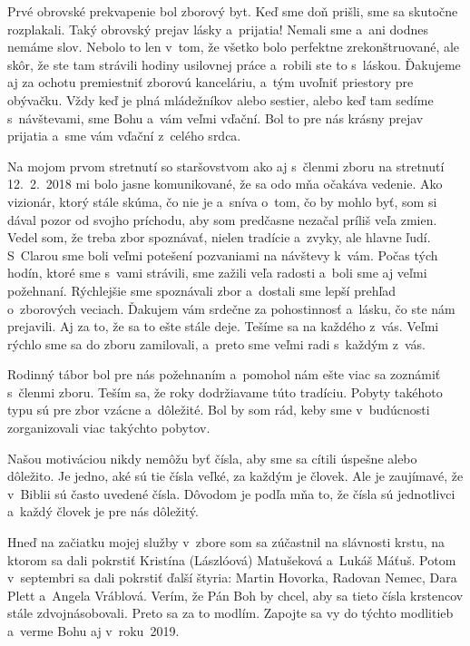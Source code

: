 Prvé obrovské prekvapenie bol zborový byt. Keď sme doň prišli, sme sa skutočne rozplakali. Taký obrovský prejav lásky a~prijatia! Nemali sme a~ani dodnes nemáme slov. Nebolo to len v~tom, že všetko bolo perfektne zrekonštruované, ale skôr, že ste tam strávili hodiny usilovnej práce a~robili ste to s~láskou. Ďakujeme aj za ochotu premiestniť zborovú kanceláriu, a~tým uvoľniť priestory pre obývačku. Vždy keď je plná mládežníkov alebo sestier, alebo keď tam sedíme s~návštevami, sme Bohu a~vám veľmi vďační. Bol to pre nás krásny prejav prijatia a~sme vám vďační z~celého srdca.

Na mojom prvom stretnutí so staršovstvom ako aj s~členmi zboru na stretnutí 12.~2.~2018 mi bolo jasne komunikované, že sa odo mňa očakáva vedenie. Ako vizionár, ktorý stále skúma, čo nie je a~sníva o~tom, čo by mohlo byť, som si dával pozor od svojho príchodu, aby som predčasne nezačal príliš veľa zmien. Vedel som, že treba zbor spoznávať, nielen tradície a~zvyky, ale hlavne ľudí. S~Clarou sme boli veľmi potešení pozvaniami na návštevy k~vám. Počas tých hodín, ktoré sme s~vami strávili, sme zažili veľa radosti a~boli sme aj veľmi požehnaní. Rýchlejšie sme spoznávali zbor a~dostali sme lepší prehľad o~zborových veciach. Ďakujem vám srdečne za pohostinnosť a~lásku, čo ste nám prejavili.  Aj za to, že sa to ešte stále deje. Tešíme sa na každého z~vás. Veľmi rýchlo sme sa do zboru zamilovali, a~preto sme veľmi radi s~každým z~vás.

Rodinný tábor bol pre nás požehnaním a~pomohol nám ešte viac sa zoznámiť s~členmi zboru. Teším sa, že roky dodržiavame túto tradíciu. Pobyty takéhoto typu sú pre zbor vzácne a~dôležité. Bol by som rád, keby sme v~budúcnosti zorganizovali viac takýchto pobytov.


Našou motiváciou nikdy nemôžu byť čísla, aby sme sa cítili úspešne alebo dôležito. Je jedno, aké sú tie čísla veľké, za každým je človek. Ale je zaujímavé, že v~Biblii sú často uvedené čísla. Dôvodom je podľa mňa to, že čísla sú jednotlivci a~každý človek je pre nás dôležitý.

Hneď na začiatku mojej služby v~zbore som sa zúčastnil na slávnosti krstu, na ktorom sa dali pokrstiť Kristína (Lászlóová) Matušeková a~Lukáš Máťuš. Potom v~septembri sa dali pokrstiť ďalší štyria: Martin Hovorka, Radovan Nemec, Dara Plett a~Angela Vráblová. Verím, že Pán Boh by chcel, aby sa tieto čísla krstencov stále zdvojnásobovali. Preto sa za to modlím. Zapojte sa vy do týchto modlitieb a~verme Bohu aj v~roku~2019.

